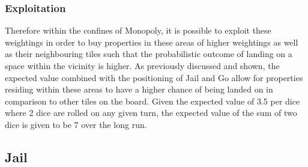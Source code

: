 \documentclass[12pt]{article}
\begin{document}
\subsubsection{Exploitation}
Therefore within the confines of Monopoly, it is possible to exploit these weightings in order to buy properties in these areas of higher weightings as well as their neighbouring tiles such that the probabilistic outcome of landing on a space within the vicinity is higher. As previously discussed and shown, the expected value combined with the positioning of Jail and Go allow for properties residing within these areas to have a higher chance of being landed on in comparison to other tiles on the board. Given the expected value of 3.5 per dice where 2 dice are rolled on any given turn, the expected value of the sum of two dice is given to be 7 over the long run.\cite{hentzeli}
\clearpage
\subsection{Jail}
\end{document}
